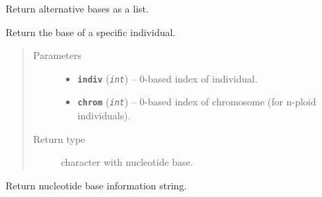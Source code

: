 \documentclass[letterpaper,10pt,english]{sphinxmanual}
\begin{document}
\begin{fulllineitems}
\begin{quote}
\begin{description}
\begin{itemize}
\end{itemize}

\end{description}\end{quote}

\begin{fulllineitems}
\label{vcf:libPoMo.vcf.NucBase.get_alt_base_list}
Return alternative bases as a list.

\end{fulllineitems}


\begin{fulllineitems}
\label{vcf:libPoMo.vcf.NucBase.get_base_ind}
Return the base of a specific individual.
\begin{quote}\begin{description}
\item[{Parameters}] \leavevmode\begin{itemize}
\item {} 
\textbf{\texttt{indiv}} (\emph{\texttt{int}}) -- 0-based index of individual.

\item {} 
\textbf{\texttt{chrom}} (\emph{\texttt{int}}) -- 0-based index of chromosome (for n-ploid
individuals).

\end{itemize}

\item[{Return type}] \leavevmode
character with nucleotide base.

\end{description}\end{quote}

\end{fulllineitems}


\begin{fulllineitems}
\label{vcf:libPoMo.vcf.NucBase.get_info}
Return nucleotide base information string.

\end{fulllineitems}



\end{fulllineitems}
\end{document}
